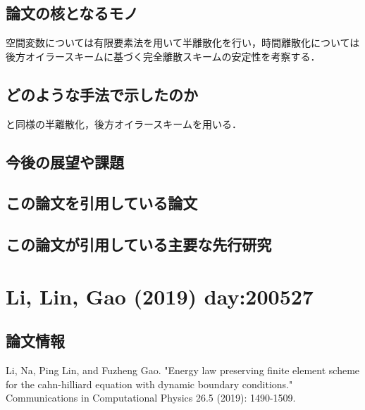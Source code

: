 \documentclass[openary, a4paper, oneside]{jsarticle}
\begin{document}
  \subsection{論文の核となるモノ}
  空間変数については有限要素法を用いて半離散化を行い，時間離散化については後方オイラースキームに基づく完全離散スキームの安定性を考察する．
  \subsection{どのような手法で示したのか}
  \cite{CherfilsPetcuPierre2010}と同様の半離散化，後方オイラースキームを用いる．
  \subsection{今後の展望や課題}
  \subsection{この論文を引用している論文}
  \subsection{この論文が引用している主要な先行研究}

\newpage
\section{Li, Lin, Gao (2019) day:200527}
  \subsection{論文情報}
  Li, Na, Ping Lin, and Fuzheng Gao. "Energy law preserving finite element scheme for the cahn-hilliard equation with dynamic boundary conditions." Communications in Computational Physics 26.5 (2019): 1490-1509.
\end{document}
